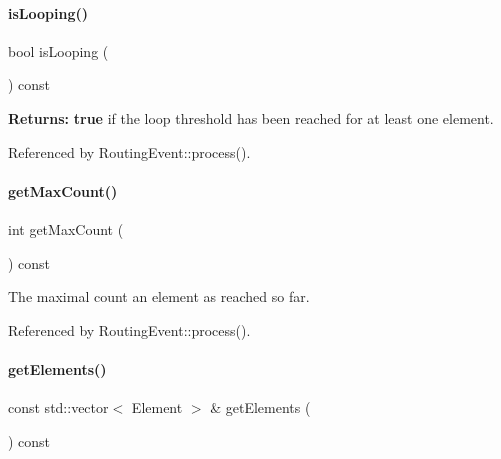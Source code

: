 \paragraph{\texorpdfstring{is\+Looping()}{isLooping()}}
{\footnotesize\ttfamily bool is\+Looping (\begin{DoxyParamCaption}{ }\end{DoxyParamCaption}) const\hspace{0.3cm}{\ttfamily [inline]}}

{\bfseries Returns\+:} {\bfseries true} if the loop threshold has been reached for at least one element. 

Referenced by Routing\+Event\+::process().

\mbox{\label{classKite_1_1RoutingEventLoop_a5744f7f01d26947fb0765bc5d1e2c3bd}} 
\paragraph{\texorpdfstring{get\+Max\+Count()}{getMaxCount()}}
{\footnotesize\ttfamily int get\+Max\+Count (\begin{DoxyParamCaption}{ }\end{DoxyParamCaption}) const\hspace{0.3cm}{\ttfamily [inline]}}

The maximal count an element as reached so far. 

Referenced by Routing\+Event\+::process().

\mbox{\label{classKite_1_1RoutingEventLoop_a7411a9e20edba3f3eeceb237dec86ff3}} 
\paragraph{\texorpdfstring{get\+Elements()}{getElements()}}
{\footnotesize\ttfamily const std\+::vector$<$ Element $>$ \& get\+Elements (\begin{DoxyParamCaption}{ }\end{DoxyParamCaption}) const\hspace{0.3cm}{\ttfamily [inline]}}

